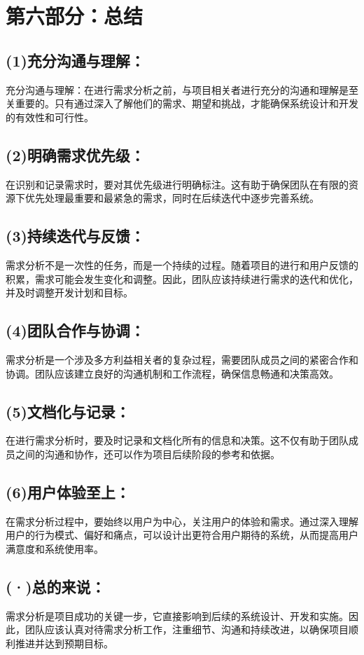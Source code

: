 \documentclass[24pt,a4paper]{article}%
\begin{document}
\section*{\songti 第六部分：总结}
\subsection*{\songti (1)充分沟通与理解：}
充分沟通与理解：在进行需求分析之前，与项目相关者进行充分的沟通和理解是至关重要的。只有通过深入了解他们的需求、期望和挑战，才能确保系统设计和开发的有效性和可行性。
\subsection*{\songti (2)明确需求优先级：}
在识别和记录需求时，要对其优先级进行明确标注。这有助于确保团队在有限的资源下优先处理最重要和最紧急的需求，同时在后续迭代中逐步完善系统。
\subsection*{\songti (3)持续迭代与反馈：}
需求分析不是一次性的任务，而是一个持续的过程。随着项目的进行和用户反馈的积累，需求可能会发生变化和调整。因此，团队应该持续进行需求的迭代和优化，并及时调整开发计划和目标。
\subsection*{\songti (4)团队合作与协调：}
需求分析是一个涉及多方利益相关者的复杂过程，需要团队成员之间的紧密合作和协调。团队应该建立良好的沟通机制和工作流程，确保信息畅通和决策高效。
\subsection*{\songti (5)文档化与记录：}
在进行需求分析时，要及时记录和文档化所有的信息和决策。这不仅有助于团队成员之间的沟通和协作，还可以作为项目后续阶段的参考和依据。
\subsection*{\songti (6)用户体验至上：}
在需求分析过程中，要始终以用户为中心，关注用户的体验和需求。通过深入理解用户的行为模式、偏好和痛点，可以设计出更符合用户期待的系统，从而提高用户满意度和系统使用率。
\subsection*{\songti (·)总的来说：}
需求分析是项目成功的关键一步，它直接影响到后续的系统设计、开发和实施。因此，团队应该认真对待需求分析工作，注重细节、沟通和持续改进，以确保项目顺利推进并达到预期目标。
\newpage
\end{document}
